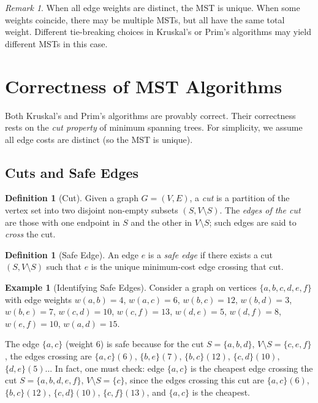 \documentclass[11pt, a4paper, notitlepage]{report}
\theoremstyle{definition}
\newtheorem{definition}[theorem]{Definition}
\newtheorem{example}[theorem]{Example}
\theoremstyle{remark}
\newtheorem{remark}[theorem]{Remark}
\begin{document}
\begin{remark}
\label{rem:mst-uniqueness}
When all edge weights are distinct, the MST is unique. When some weights coincide, there may be multiple MSTs, but all have the same total weight. Different tie-breaking choices in Kruskal's or Prim's algorithms may yield different MSTs in this case.
\end{remark}

\section{Correctness of MST Algorithms}
\label{sec:mst-correctness}

Both Kruskal's and Prim's algorithms are provably correct. Their correctness rests on the \emph{cut property} of minimum spanning trees. For simplicity, we assume all edge costs are distinct (so the MST is unique).

\subsection{Cuts and Safe Edges}
\label{subsec:cuts-safe}

\begin{definition}[Cut]
\label{def:cut}
Given a graph $G = (V, E)$, a \emph{cut} is a partition of the vertex set into two disjoint non-empty subsets $(S, V \setminus S)$. The \emph{edges of the cut} are those with one endpoint in $S$ and the other in $V \setminus S$; such edges are said to \emph{cross} the cut.
\end{definition}

\begin{definition}[Safe Edge]
\label{def:safe-edge}
An edge $e$ is a \emph{safe edge} if there exists a cut $(S, V \setminus S)$ such that $e$ is the unique minimum-cost edge crossing that cut.
\end{definition}

\begin{example}[Identifying Safe Edges]
\label{ex:safe-edge}
Consider a graph on vertices $\{a,b,c,d,e,f\}$ with edge weights $w(a,b)=4$, $w(a,c)=6$, $w(b,c)=12$, $w(b,d)=3$, $w(b,e)=7$, $w(c,d)=10$, $w(c,f)=13$, $w(d,e)=5$, $w(d,f)=8$, $w(e,f)=10$, $w(a,d)=15$.

The edge $\{a,c\}$ (weight 6) is safe because for the cut $S = \{a,b,d\}$, $V \setminus S = \{c,e,f\}$, the edges crossing are $\{a,c\}(6)$, $\{b,e\}(7)$, $\{b,c\}(12)$, $\{c,d\}(10)$, $\{d,e\}(5)$... In fact, one must check: edge $\{a,c\}$ is the cheapest edge crossing the cut $S=\{a,b,d,e,f\}$, $V\setminus S=\{c\}$, since the edges crossing this cut are $\{a,c\}(6)$, $\{b,c\}(12)$, $\{c,d\}(10)$, $\{c,f\}(13)$, and $\{a,c\}$ is the cheapest.
\end{example}
\end{document}
